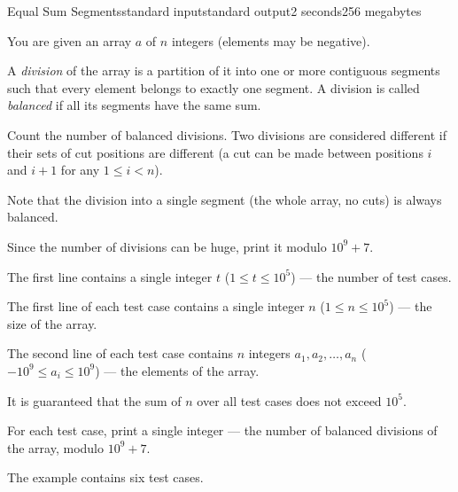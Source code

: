 \begin{problem}{Equal Sum Segments}{standard input}{standard output}{2 seconds}{256 megabytes}

You are given an array $a$ of $n$ integers (elements may be negative).

A \emph{division} of the array is a partition of it into one or more contiguous segments such that every element belongs to exactly one segment. A division is called \emph{balanced} if all its segments have the same sum.

Count the number of balanced divisions. Two divisions are considered different if their sets of cut positions are different (a cut can be made between positions $i$ and $i+1$ for any $1 \le i < n$).

Note that the division into a single segment (the whole array, no cuts) is always balanced.

Since the number of divisions can be huge, print it modulo $10^9 + 7$.


\InputFile
The first line contains a single integer $t$ ($1 \le t \le 10^5$) --- the number of test cases.

The first line of each test case contains a single integer $n$ ($1 \le n \le 10^5$) --- the size of the array.

The second line of each test case contains $n$ integers $a_1, a_2, \ldots, a_n$ ($-10^9 \le a_i \le 10^9$) --- the elements of the array.

It is guaranteed that the sum of $n$ over all test cases does not exceed $10^5$.


\OutputFile
For each test case, print a single integer --- the number of balanced divisions of the array, modulo $10^9 + 7$.


\Example

\begin{example}
%
\end{example}

\Note
The example contains six test cases.


\end{problem}
